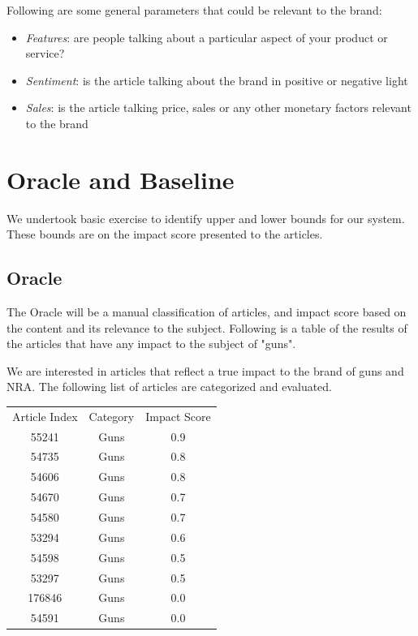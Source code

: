 \documentclass{article}
\begin{document}
Following are some general parameters that could be relevant to the brand:

\begin{itemize}
	\item \textit{Features}: are people talking about a particular aspect of your product or service?
	\item \textit{Sentiment}: is the article talking about the brand in positive or negative light
	\item \textit{Sales}: is the article talking price, sales or any other monetary factors relevant to the brand
\end{itemize}


\section{Oracle and Baseline} %

We undertook basic exercise to identify upper and lower bounds for our system. These bounds are on the impact score presented to the articles.

\subsection{Oracle}
The Oracle will be a manual classification of articles, and impact score based on the content and its relevance to the subject.
Following is a table of the results of the articles that have any impact to the subject of "guns".

We are interested in articles that reflect a true impact to the brand of guns and NRA.
The following list of articles are categorized and evaluated.

\begin{center}
		\begin{tabular}{ c c c }
			Article Index & Category & Impact Score \\
			55241 & Guns & 0.9 \\ 
			54735 & Guns & 0.8 \\ 
			54606 & Guns & 0.8 \\ 
			54670 & Guns & 0.7 \\ 
			54580 & Guns & 0.7 \\ 
			53294 & Guns & 0.6 \\ 
			54598 & Guns & 0.5 \\ 
			53297 & Guns & 0.5 \\ 
			176846 & Guns & 0.0 \\ 
			54591 & Guns  & 0.0 \\  	 
		\end{tabular}
	\end{center}
\end{document}
